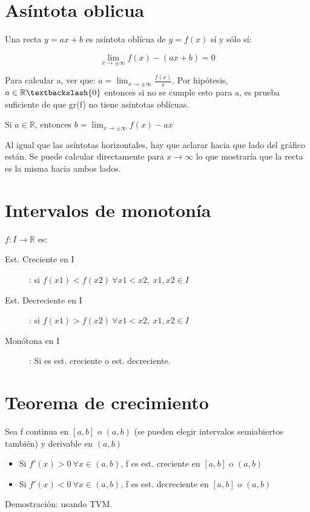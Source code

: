 \documentclass{report}
\begin{document}
	\section{Asíntota oblicua}
		Una recta $y=ax+b$ es asíntota oblícua de $y=f(x)$ sí y sólo sí:
		
		$$\lim_{x \to \pm\infty}f(x)-(ax+b)=0$$
		
		Para calcular a, ver que: $a=\lim_{x \to \pm\infty}\frac{f(x)}{x}$. Por hipótesis, $a \in \mathbb{R}\textbackslash\{0\}$ entonces si no se cumple esto para a, es prueba suficiente de que gr(f) no tiene asíntotas oblícuas.
		
		Si $a \in \mathbb{R}$, entonces $b=\lim_{x \to \pm\infty}f(x)-ax$
		
		Al igual que las asíntotas horizontales, hay que aclarar hacia que lado del gráfico están. Se puede calcular directamente para $x \to \infty$ lo que mostraría que la recta es la misma hacia ambos lados.
		
	\section{Intervalos de monotonía}
		$f:I\to\mathbb{R}$ es:
		
		\begin{description}
			\item[Est. Creciente en I]: si $f(x1)<f(x2) \ \forall x1<x2 , \ x1,x2 \in I$
			\item[Est. Decreciente en I]: si $f(x1)>f(x2) \ \forall x1<x2 , \ x1,x2 \in I$
			\item[Monótona en I]: Si es est. creciente o est. decreciente.
		\end{description}
	
	\section{Teorema de crecimiento}
		Sea f continua en $[a,b]$ o $(a,b)$ (se pueden elegir intervalos semiabiertos también) y derivable en $(a,b)$
		
		\begin{itemize}
			\item Si $f'(x)>0 \ \forall x \in (a,b)$, f es est. creciente en $[a,b]$ o $(a,b)$
			\item Si $f'(x)<0 \ \forall x \in (a,b)$, f es est. decreciente en $[a,b]$ o $(a,b)$
		\end{itemize}
	
		Demostración: usando TVM.
		
\end{document}
